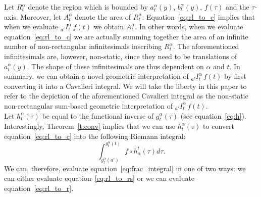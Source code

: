 \documentclass[twoside,reqno,11pt]{fcaa-var} %
\begin{document}
\noindent
Let $R_t^{\alpha}$ denote the region which is bounded by $a_t^{\alpha}(y)$, $b_t^{\alpha}(y)$, $f(\tau)$ and the $\tau$-axis. Moreover, let $A_{t}^{\alpha}$ denote the area of $R_t^{\alpha}$. Equation~\eqref{eq:rl_to_c} implies that when we evaluate $_{a'}I_t^{\alpha}\,f(t)$ we obtain $A_{t}^{\alpha}$. In other words, when we evaluate equation~\eqref{eq:rl_to_c} we are actually summing together the area of an infinite number of non-rectangular infinitesimals inscribing $R_t^{\alpha}$. The aforementioned infinitesimals are, however, non-static, since they need to be translations of $a_t^{\alpha}(y)$. The shape of these infinitesimals are thus dependent on $\alpha$ and $t$. In summary, we can obtain a novel geometric interpretation of 
$_{a'}I_t^{\alpha}\,f(t)$ by first converting it into a Cavalieri integral. We will take the liberty in this paper to refer to the depiction of the aforementioned Cavalieri integral as the non-static non-rectangular sum-based geometric interpretation of $_{a'}I_t^{\alpha}\,f(t)$.\\


\noindent
Let $h_t^{\alpha}(\tau)$ be equal to the functional inverse of $g_t^{\alpha}(\tau)$ (see equation~\eqref{eq:h}). Interestingly, Theorem~\ref{t:conv} implies that we can use $h_t^{\alpha}(\tau)$ to convert equation~\eqref{eq:rl_to_c} into the following Riemann integral:
\begin{equation}
\label{eq:rl_to_r}
\int_{g_t^{\alpha}(a')}^{g_t^{\alpha}(t)} f\circ h_{\alpha}^t (\tau) d\tau.  
\end{equation}
We can, therefore, evaluate equation~\eqref{eq:frac_integral} in one of two ways: we can either evaluate equation~\eqref{eq:rl_to_rs} or we can evaluate equation~\eqref{eq:rl_to_r}.
\end{document}
